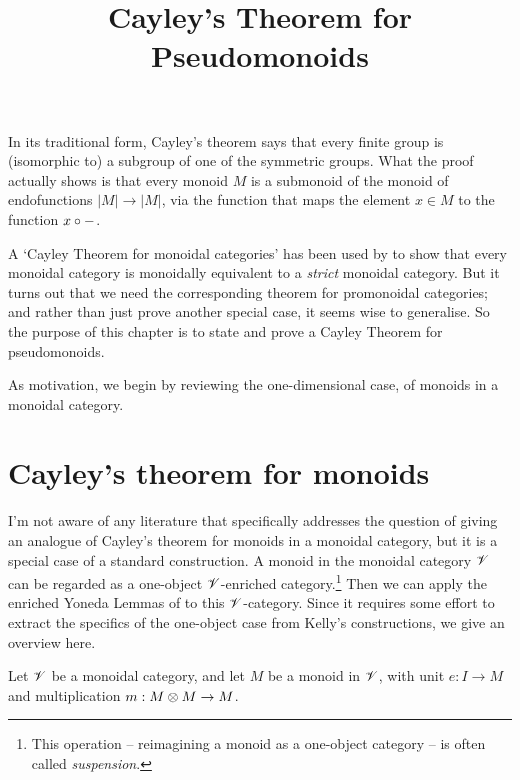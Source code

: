 \documentclass{robinthesisdraft}
\title{Cayley's Theorem for Pseudomonoids}
\begin{document}
\maketitle

In its traditional form, Cayley's theorem says that every finite group
is (isomorphic to) a subgroup of one of the symmetric groups. What the
proof actually shows is that every monoid $M$ is a submonoid of the monoid
of endofunctions $|M|\to|M|$, via the function that maps the element $x\in M$
to the function $x\circ-$.

A `Cayley Theorem for monoidal categories' has been used by
\citet[Proposition~1.3]{BTC} to show that every monoidal category
is monoidally equivalent to a \emph{strict} monoidal category.
But it turns out that we need the corresponding theorem for
promonoidal categories; and rather than just prove another special
case, it seems wise to generalise. So the purpose of this
chapter is to state and prove a Cayley Theorem for pseudomonoids.

As motivation, we begin by reviewing the one-dimensional case,
of monoids in a monoidal category.

\section{Cayley's theorem for monoids}

I'm not aware of any literature that specifically addresses the
question of giving an analogue of Cayley's theorem for monoids
in a monoidal category, but it is a special case of a standard
construction. A monoid in the monoidal category $\mathscr{V}$ can be
regarded as a one-object $\mathscr{V}$-enriched category.\footnote{This
operation -- reimagining a monoid as a one-object category -- is often
called \emph{suspension}.} Then we can apply the enriched Yoneda
Lemmas of \citet[sections~1.9 and~2.4]{KellyEnriched} to this
$\mathscr{V}$-category. Since it requires some effort to extract the
specifics of the one-object case from Kelly's constructions,
we give an overview here.

Let $\mathscr{V}$ be a monoidal category, and let $M$ be a monoid in $\mathscr{V}$,
with unit $e: I\to M$ and multiplication $m: M\tn M\to M$.
%
\end{document}
